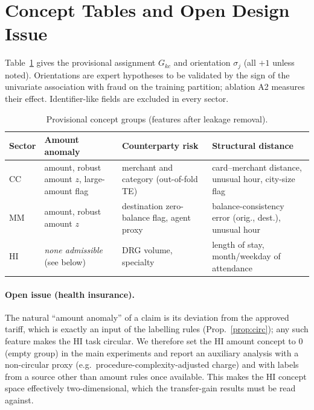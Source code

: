 \documentclass[journal]{IEEEtran}
\newcommand{\1}{\mathbf{1}}
\begin{document}
\section{Concept Tables and Open Design Issue}\label{app:concepts}
Table~\ref{tab:concepts} gives the provisional assignment $G_{kc}$ and orientation $\sigma_j$ (all $+1$ unless noted). Orientations are expert hypotheses to be validated by the sign of the univariate association with fraud on the training partition; ablation A2 measures their effect. Identifier-like fields are excluded in every sector.
\begin{table}[h]
\centering
\caption{Provisional concept groups (features after leakage removal).}
\label{tab:concepts}
\scriptsize
\begin{tabular}{@{}p{1.1cm}p{2.2cm}p{2.3cm}p{2.1cm}@{}}
\toprule
Sector & Amount anomaly & Counterparty risk & Structural distance \\
\midrule
CC & amount, robust amount $z$, large-amount flag & merchant and category (out-of-fold TE) & card--merchant distance, unusual hour, city-size flag \\
MM & amount, robust amount $z$ & destination zero-balance flag, agent proxy & balance-consistency error (orig., dest.), unusual hour \\
HI & \emph{none admissible} (see below) & DRG volume, specialty & length of stay, month/weekday of attendance \\
\bottomrule
\end{tabular}
\end{table}
\paragraph{Open issue (health insurance).} The natural ``amount anomaly'' of a claim is its deviation from the approved tariff, which is exactly an input of the labelling rules (Prop.~\ref{prop:circ}); any such feature makes the HI task circular. We therefore set the HI amount concept to $0$ (empty group) in the main experiments and report an auxiliary analysis with a non-circular proxy (e.g.\ procedure-complexity-adjusted charge) and with labels from a source other than amount rules once available. This makes the HI concept space effectively two-dimensional, which the transfer-gain results must be read against.
\end{document}
